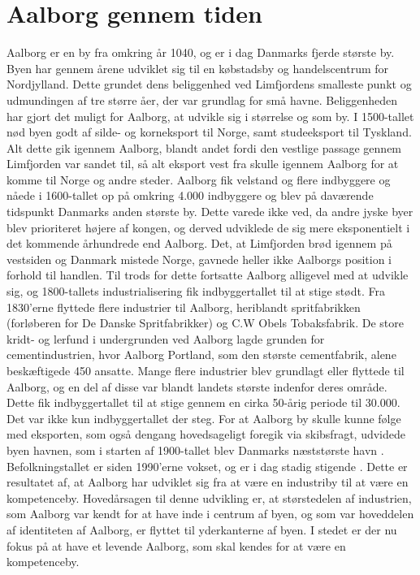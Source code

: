 \section{Aalborg gennem tiden}
Aalborg er en by fra omkring år 1040, og er i dag Danmarks fjerde største by. Byen har gennem årene udviklet sig til en købstadsby og handelscentrum for Nordjylland. Dette grundet dens beliggenhed ved Limfjordens smalleste punkt og udmundingen af tre større åer, der var grundlag for små havne. Beliggenheden har gjort det muligt for Aalborg, at udvikle sig i størrelse og som by. I 1500-tallet nød byen godt af silde- og korneksport til Norge, samt studeeksport til Tyskland. Alt dette gik igennem Aalborg, blandt andet fordi den vestlige passage gennem Limfjorden var sandet til, så alt eksport vest fra skulle igennem Aalborg for at komme til Norge og andre steder. Aalborg fik velstand og flere indbyggere og nåede i 1600-tallet op på omkring 4.000 indbyggere og blev på daværende tidspunkt Danmarks anden største by. Dette varede ikke ved, da andre jyske byer blev prioriteret højere af kongen, og derved udviklede de sig mere eksponentielt i det kommende århundrede end Aalborg. Det, at Limfjorden brød igennem på vestsiden og Danmark mistede Norge, gavnede heller ikke Aalborgs position i forhold til handlen. 
\newline \indent{     }  Til trods for dette fortsatte Aalborg alligevel med at udvikle sig, og 1800-tallets industrialisering fik indbyggertallet til at stige stødt. Fra 1830’erne flyttede flere industrier til Aalborg, heriblandt spritfabrikken (forløberen for De Danske Spritfabrikker) og C.W Obels Tobaksfabrik. De store kridt- og lerfund i undergrunden ved Aalborg lagde grunden for cementindustrien, hvor Aalborg Portland, som den største cementfabrik, alene beskæftigede 450 ansatte. Mange flere industrier blev grundlagt eller flyttede til Aalborg, og en del af disse var blandt landets største indenfor deres område. Dette fik indbyggertallet til at stige gennem en cirka 50-årig periode til 30.000. Det var ikke kun indbyggertallet der steg. For at Aalborg by skulle kunne følge med eksporten, som også dengang hovedsageligt foregik via skibsfragt, udvidede byen havnen, som i starten af 1900-tallet blev Danmarks næststørste havn \citep{byhistorie}.
\newline \indent{     }  Befolkningstallet er siden 1990'erne vokset, og er i dag stadig stigende \citep{indbyggertal}. Dette er resultatet af, at Aalborg har udviklet sig fra at være en industriby til at være en kompetenceby. Hovedårsagen til denne udvikling er, at størstedelen af industrien, som Aalborg var kendt for at have inde i centrum af byen, og som var hoveddelen af identiteten af Aalborg, er flyttet til yderkanterne af byen. I stedet er der nu fokus på at have et levende Aalborg, som skal kendes for at være en kompetenceby.
